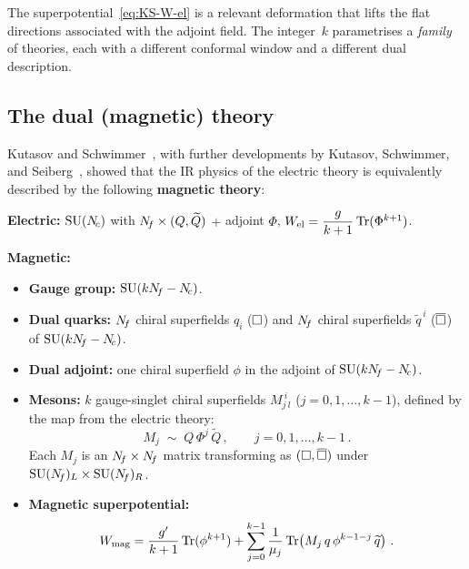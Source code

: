 \documentclass[11pt,a4paper]{article}
\begin{document}
The superpotential~\eqref{eq:KS-W-el} is a relevant deformation
that lifts the flat directions associated with the adjoint field.
The integer~$k$ parametrises a \emph{family} of theories, each with
a different conformal window and a different dual description.

\subsection{The dual (magnetic) theory}
\label{ssec:ks-magnetic}

Kutasov and Schwimmer~\cite{KS9505004}, with further developments
by Kutasov, Schwimmer, and Seiberg~\cite{KSS9510222}, showed that
the IR physics of the electric theory is equivalently described by
the following \textbf{magnetic theory}:

\begin{tcolorbox}[
  enhanced,
  colback=blue!5!white,
  colframe=blue!70!black,
  fonttitle=\bfseries\large,
  title={Kutasov--Schwimmer Duality},
  breakable
]
\textbf{Electric:} $\mathrm{SU}(N_{\!c})$ with $N_{\!f} \times (Q, \widetilde{Q})$
$+$ adjoint $\Phi$, \quad $W_{\text{el}} = \dfrac{g}{k+1}\,
\mathrm{Tr}(\Phi^{k+1})$.

\medskip

\textbf{Magnetic:}
\begin{itemize}
  \item \textbf{Gauge group:} $\mathrm{SU}(kN_{\!f} - N_{\!c})$.
  \item \textbf{Dual quarks:} $N_{\!f}$ chiral superfields $q_i$
    ($\square$) and $N_{\!f}$ chiral superfields $\widetilde{q}^{\,i}$
    ($\overline{\square}$) of $\mathrm{SU}(kN_{\!f} - N_{\!c})$.
  \item \textbf{Dual adjoint:} one chiral superfield $\phi$ in the
    adjoint of $\mathrm{SU}(kN_{\!f} - N_{\!c})$.
  \item \textbf{Mesons:} $k$ gauge-singlet chiral superfields
    $M_j^{\ i}{}_{\!l}$ ($j = 0, 1, \ldots, k-1$), defined by the
    map from the electric theory:
    \begin{equation}\label{eq:KS-meson-map}
      M_j \;\sim\; Q\, \Phi^j\, \widetilde{Q}\,,
      \qquad j = 0, 1, \ldots, k-1\,.
    \end{equation}
    Each $M_j$ is an $N_{\!f} \times N_{\!f}$ matrix transforming as
    $(\square, \overline{\square})$ under $\mathrm{SU}(N_{\!f})_L \times \mathrm{SU}(N_{\!f})_R$.
  \item \textbf{Magnetic superpotential:}
    \begin{equation}\label{eq:KS-W-mag}
      W_{\text{mag}} = \frac{g'}{k+1}\,\mathrm{Tr}(\phi^{k+1})
      + \sum_{j=0}^{k-1} \frac{1}{\mu_j}\,
      \mathrm{Tr}\!\left(M_j\, q\, \phi^{k-1-j}\, \widetilde{q}\right)\,.
    \end{equation}
\end{itemize}
\end{tcolorbox}
\end{document}
